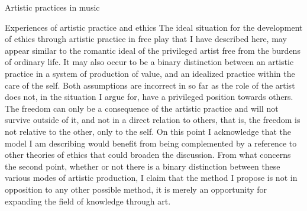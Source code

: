 \documentclass[presentation]{beamer}
\begin{document}
\begin{frame}[label={sec:org952e88c}]{Artistic practices in music}
\begin{block}{Experiences of artistic practice and ethics}
The ideal situation for the development of ethics through artistic practice in free play that I have described here, may appear similar to the romantic ideal of the privileged artist free from the burdens of ordinary life. It may also occur to be a binary distinction between an artistic practice in a system of production of value, and an idealized practice within the care of the self. Both assumptions are incorrect in so far as the role of the artist does not, in the situation I argue for, have a privileged position towards others. The freedom can only be a consequence of the artistic practice and will not survive outside of it, and not in a direct relation to others, that is, the freedom is not relative to the other, only to the self. On this point I acknowledge that the model I am describing would benefit from being complemented by a reference to other theories of ethics that could broaden the discussion. From what concerns the second point, whether or not there is a binary distinction between these various modes of artistic production, I claim that the method I propose is not in opposition to any other possible method, it is merely an opportunity for expanding the field of knowledge through art.
\end{block}
\end{frame}
\end{document}

